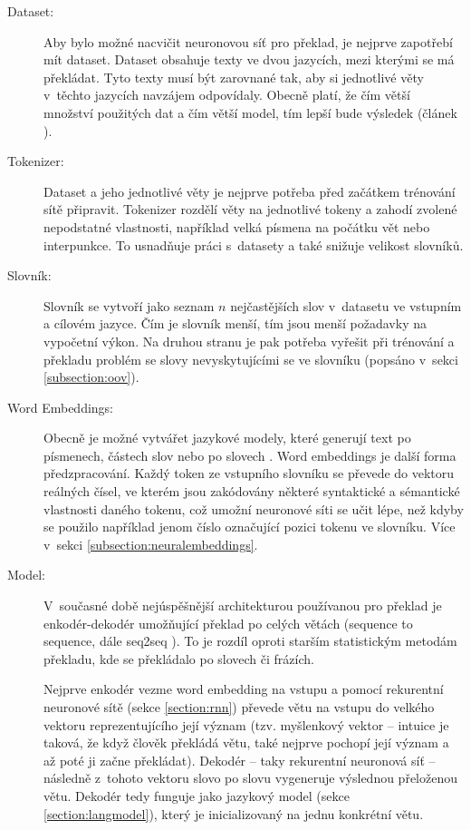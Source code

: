 \begin{description}
  \item[Dataset:] Aby bylo možné nacvičit neuronovou síť pro překlad, je nejprve zapotřebí mít dataset. Dataset obsahuje texty ve dvou jazycích, mezi kterými se má překládat. Tyto texty musí být zarovnané tak, aby si jednotlivé věty v~těchto jazycích navzájem odpovídaly. Obecně platí, že čím větší množství použitých dat a čím větší model, tím lepší bude výsledek (článek \cite{googleLimits}).

  \item[Tokenizer:] Dataset a jeho jednotlivé věty je nejprve potřeba před začátkem trénování sítě připravit. Tokenizer rozdělí věty na jednotlivé tokeny a zahodí zvolené nepodstatné vlastnosti, například velká písmena na počátku vět nebo interpunkce. To usnadňuje práci s~datasety a také snižuje velikost slovníků.

  \item[Slovník:] Slovník se vytvoří jako seznam $n$ nejčastějších slov v~datasetu ve vstupním a cílovém jazyce. Čím je slovník menší, tím jsou menší požadavky na vypočetní výkon. Na druhou stranu je pak potřeba vyřešit při trénování a překladu problém se slovy nevyskytujícími se ve slovníku (popsáno v~sekci \ref{subsection:oov}).

  \item[Word Embeddings:] Obecně je možné vytvářet jazykové modely, které generují text po písmenech, částech slov nebo po slovech \cite{mikolovSubwords}. Word embeddings je další forma předzpracování. Každý token ze vstupního slovníku se převede do vektoru reálných čísel, ve kterém jsou zakódovány některé syntaktické a sémantické vlastnosti daného tokenu, což umožní neuronové síti se učit lépe, než kdyby se použilo například jenom číslo označující pozici tokenu ve slovníku. Více v~sekci \ref{subsection:neuralembeddings}.

  \item[Model:] V~současné době nejúspěšnější architekturou používanou pro překlad je enkodér-dekodér umožňující překlad po celých větách (sequence to sequence, dále seq2seq \cite{seq2seq}). To je rozdíl oproti starším statistickým metodám překladu, kde se překládalo po slovech či frázích.

      Nejprve enkodér vezme word embedding na vstupu a pomocí rekurentní neuronové sítě (sekce \ref{section:rnn}) převede větu na vstupu do velkého vektoru reprezentujícího její význam (tzv. myšlenkový vektor -- intuice je taková, že když člověk překládá větu, také nejprve pochopí její význam a až poté ji začne překládat). Dekodér -- taky rekurentní neuronová síť -- následně z~tohoto vektoru slovo po slovu vygeneruje výslednou přeloženou větu. Dekodér tedy funguje jako jazykový model (sekce \ref{section:langmodel}), který je inicializovaný na jednu konkrétní větu.
\end{description}



